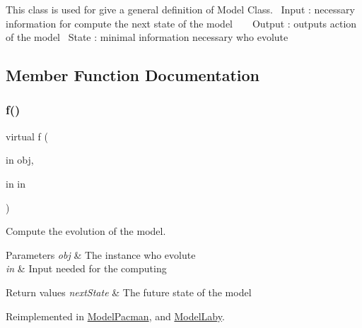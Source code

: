 This class is used for give a general definition of Model Class.~\newline
 Input \+: necessary information for compute the next state of the model ~\newline
~\newline
 Output \+: output\textquotesingle{}s action of the model~\newline
 State \+: minimal information necessary who evolute~\newline
 

\subsection{Member Function Documentation}
\mbox{\label{class_model_s_e_d_ac36f9451c43b120828af4380858f2024}} 
\subsubsection{\texorpdfstring{f()}{f()}}
{\footnotesize\ttfamily virtual f (\begin{DoxyParamCaption}\item[{in}]{obj,  }\item[{in}]{in }\end{DoxyParamCaption})\hspace{0.3cm}{\ttfamily [virtual]}}



Compute the evolution of the model. 


\begin{DoxyParams}{Parameters}
{\em obj} & The instance who evolute \\
\hline
{\em in} & Input needed for the computing \\
\hline
\end{DoxyParams}

\begin{DoxyRetVals}{Return values}
{\em next\+State} & The future state of the model \\
\hline
\end{DoxyRetVals}


Reimplemented in \hyperlink{class_model_pacman_a6f3b146c92a207e95690d08975e1e072}{Model\+Pacman}, and \hyperlink{class_model_laby_a6f3b146c92a207e95690d08975e1e072}{Model\+Laby}.

\mbox{\label{class_model_s_e_d_ac6bf71081e35755d5ed9992d165afcb8}} 
